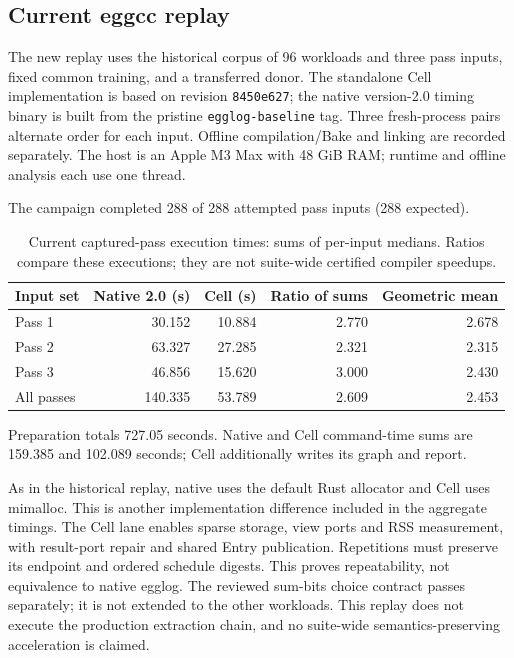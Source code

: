 \subsection{Current eggcc replay}

The new replay uses the historical corpus of 96 workloads and three pass inputs, fixed common training, and a transferred donor. The standalone Cell implementation is based on revision \texttt{8450e627}; the native version-2.0 timing binary is built from the pristine \texttt{egglog-baseline} tag. Three fresh-process pairs alternate order for each input. Offline compilation/Bake and linking are recorded separately. The host is an Apple M3 Max with 48 GiB RAM; runtime and offline analysis each use one thread.

The campaign completed 288 of 288 attempted pass inputs (288 expected).

\begin{table}[ht]\centering\small

\begin{tabular}{lrrrr}\toprule Input set & Native 2.0 (s) & Cell (s) & Ratio of sums & Geometric mean\\\midrule

Pass 1 & 30.152 & 10.884 & 2.770 & 2.678\\

Pass 2 & 63.327 & 27.285 & 2.321 & 2.315\\

Pass 3 & 46.856 & 15.620 & 3.000 & 2.430\\

\midrule All passes & 140.335 & 53.789 & 2.609 & 2.453\\

\bottomrule\end{tabular}

\caption{Current captured-pass execution times: sums of per-input medians. Ratios compare these executions; they are not suite-wide certified compiler speedups.}\label{tab:current-suite}\end{table}

Preparation totals 727.05 seconds. Native and Cell command-time sums are 159.385 and 102.089 seconds; Cell additionally writes its graph and report.

As in the historical replay, native uses the default Rust allocator and Cell uses mimalloc. This is another implementation difference included in the aggregate timings. The Cell lane enables sparse storage, view ports and RSS measurement, with result-port repair and shared Entry publication. Repetitions must preserve its endpoint and ordered schedule digests. This proves repeatability, not equivalence to native egglog. The reviewed sum-bits choice contract passes separately; it is not extended to the other workloads. This replay does not execute the production extraction chain, and no suite-wide semantics-preserving acceleration is claimed.

